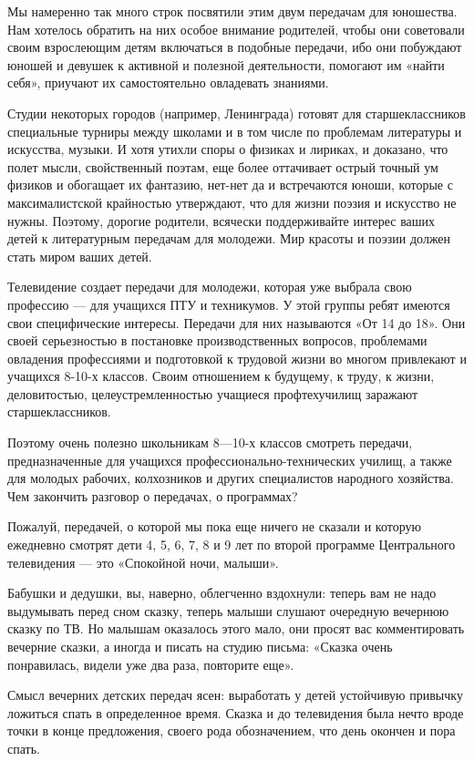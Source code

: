 \documentclass[12pt, a4paper, openany]{book}
\begin{document}
Мы намеренно так много строк посвятили этим двум передачам для юношества. Нам хотелось обратить на них особое внимание родителей, чтобы они советовали своим взрослеющим детям включаться в подобные передачи, ибо они побуждают юношей и девушек к активной и полезной деятельности, помогают им «найти себя», приучают их самостоятельно овладевать знаниями. 

Студии некоторых городов (например, Ленинграда) готовят для старшеклассников специальные турниры между школами и в том числе по проблемам литературы и искусства, музыки. И хотя утихли споры о физиках и лириках, и доказано, что полет мысли, свойственный поэтам, еще более оттачивает острый точный ум физиков и обогащает их фантазию, нет-нет да и встречаются юноши, которые с максималистской крайностью утверждают, что для жизни поэзия и искусство не нужны. Поэтому, дорогие родители, всячески поддерживайте интерес ваших детей к литературным передачам для молодежи. Мир красоты и поэзии должен стать миром ваших детей. 

Телевидение создает передачи для молодежи, которая уже выбрала свою профессию — для учащихся ПТУ и техникумов. У этой группы ребят имеются свои специфические интересы. Передачи для них называются «От 14 до 18». Они своей серьезностью в постановке производственных вопросов, проблемами овладения профессиями и подготовкой к трудовой жизни во многом привлекают и учащихся 8-10-х классов. Своим отношением к будущему, к труду, к жизни, деловитостью, целеустремленностью учащиеся профтехучилищ заражают старшеклассников. 

Поэтому очень полезно школьникам 8—10-х классов смотреть передачи, предназначенные для учащихся профессионально-технических училищ, а также для молодых рабочих, колхозников и других специалистов народного хозяйства. Чем закончить разговор о передачах, о программах? 

Пожалуй, передачей, о которой мы пока еще ничего не сказали и которую ежедневно смотрят дети 4, 5, 6, 7, 8 и 9 лет по второй программе Центрального телевидения — это «Спокойной ночи, малыши». 

Бабушки и дедушки, вы, наверно, облегченно вздохнули: теперь вам не надо выдумывать перед сном сказку, теперь малыши слушают очередную вечернюю сказку по ТВ. Но малышам оказалось этого мало, они просят вас комментировать вечерние сказки, а иногда и писать на студию письма: «Сказка очень понравилась, видели уже два раза, повторите еще». 

Смысл вечерних детских передач ясен: выработать у детей устойчивую привычку ложиться спать в определенное время. Сказка и до телевидения была нечто вроде точки в конце предложения, своего рода обозначением, что день окончен и пора спать. 
\end{document}
